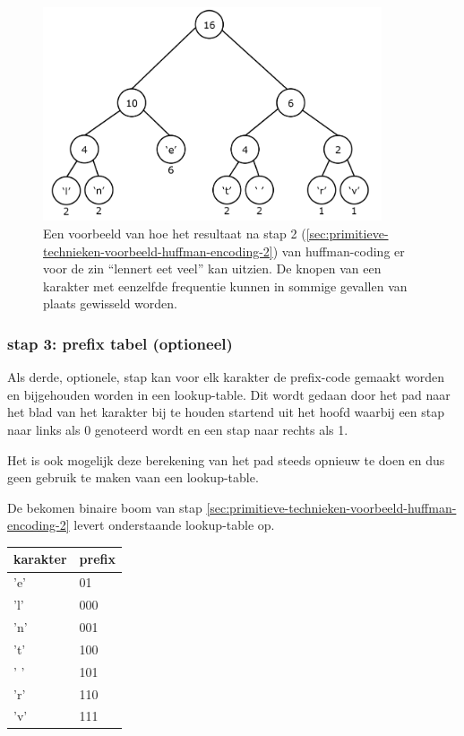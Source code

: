 \FloatBarrier
\begin{figure}[h!]
	\includegraphics[width=100mm]{img/literatuurstudie/huffman-stap-2.png}
	\caption{Een voorbeeld van hoe het resultaat na stap 2 (\ref{sec:primitieve-technieken-voorbeeld-huffman-encoding-2}) van \gls{huffman-coding} er voor de zin “lennert eet veel” kan uitzien. De knopen van een karakter met eenzelfde frequentie kunnen in sommige gevallen van plaats gewisseld worden.}
	\label{fig:huffman-stap-2}
\end{figure}
\FloatBarrier

\subsubsection{stap 3: prefix tabel (optioneel)}
\label{sec:primitieve-technieken-voorbeeld-huffman-encoding-3}
Als derde, optionele, stap kan voor elk karakter de \gls{prefix-code} gemaakt worden en bijgehouden worden in een \gls{lookup-table}. Dit wordt gedaan door het pad naar het blad van het karakter bij te houden startend uit het hoofd waarbij een stap naar links als 0 genoteerd wordt en een stap naar rechts als 1.

Het is ook mogelijk deze berekening van het pad steeds opnieuw te doen en dus geen gebruik te maken vaan een \gls{lookup-table}.

De bekomen binaire boom van stap \ref{sec:primitieve-technieken-voorbeeld-huffman-encoding-2} levert onderstaande \gls{lookup-table} op.

\FloatBarrier
\begin{table}[h!]
	\begin{tabular}{|l|l|}
		\hline
		\textbf{karakter} & \textbf{prefix} \\ \hline
		'e'               & 01              \\ \hline
		'l'               & 000             \\ \hline
		'n'               & 001             \\ \hline
		't'               & 100             \\ \hline
		' '               & 101             \\ \hline
		'r'               & 110             \\ \hline
		'v'               & 111             \\ \hline  
	\end{tabular}
\end{table}
\FloatBarrier

